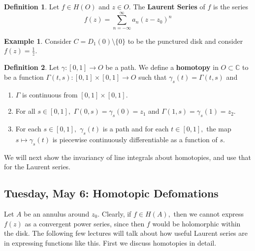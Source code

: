 \documentclass[10pt, oneside]{article}
\newcommand{\bbC}{\mathbb{C}}
\newcommand{\sm}{\setminus}
\theoremstyle{definition}
\newtheorem{exmp}{Example}[section]
\newtheorem{defn}{Definition}
\begin{document}
\begin{defn}
Let $f\in H(O)$ and $z\in O.$ The \textbf{Laurent Series} of $f$ is the series
    \[f(z) = \sum_{n=-\infty}^\infty a_n (z - z_0)^n\]
\end{defn}
\begin{exmp}
    Consider $C = D_1(0)\sm \{0\}$ to be the punctured disk and consider $f(z) = \frac{1}{z}.$
\end{exmp}
\begin{defn}
Let $\gamma:[0,1] \to O$ be a path.
    We define a \textbf{homotopy} in $O \subset \bbC$ to be a function $\Gamma(t,s) : [0,1] \times [0,1] \to O$ such that $\gamma_s(t) = \Gamma(t,s)$ and
    \begin{enumerate}
        \item $\Gamma$ is continuous from $[0,1]\times [0,1].$
        \item For all $s\in [0,1],$ $\Gamma(0,s) = \gamma_s(0) = z_1$ and $\Gamma(1,s) = \gamma_s(1) = z_2.$
        \item For each $s\in [0,1],$ $\gamma_s(t)$ is a path and for each $t\in [0,1],$ the map $s\mapsto \gamma_s(t)$ is piecewise continuously differentiable as a function of $s.$
    \end{enumerate}
\end{defn}

We will next show the invariancy of line integrals about homotopies, and use that for the Laurent series. 


\newpage
\subsection{Tuesday, May 6: Homotopic Defomations}
Let $A$ be an annulus around $z_0.$ Clearly, if $f \in H(A),$ then we cannot express $f(z)$ as a convergent power series, since then $f$ would be holomorphic within the disk. The following few lectures will talk about how useful Laurent series are in expressing functions like this. First we discuss homotopies in detail.
\end{document}
